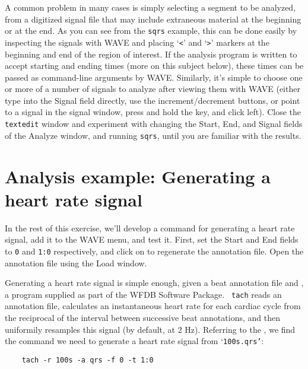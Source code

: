 \documentclass[twoside]{book}
\newcommand{\keycap}[1]{\cornersize{.5}\Ovalbox{\small\sf #1}}
\newcommand{\button}[1]{\cornersize{2}\ovalbox{\rule[-.3mm]{0cm}{2.5mm}\small\sf ~#1~}}
\newcommand{\WAVE}{{\sf WAVE}\xspace}
\begin{document}
A common problem in many cases is simply selecting a segment to be analyzed,
from a digitized signal file that may include extraneous material at the
beginning or at the end.  As you can see from the {\tt sqrs} example, this can
be done easily by inspecting the signals with \WAVE{} and placing `{\tt <}'
and `{\tt >}' markers at the beginning and end of the region of interest.  If
the analysis program is written to accept starting and ending times (more on
this subject below), these times can be passed as command-line arguments by
\WAVE{}.  Similarly, it's simple to choose one or more of a number of
signals to analyze after viewing them with \WAVE{} (either type into the
{\sf Signal} field directly, use the increment/decrement buttons, or point to
a signal in the signal window, press and hold the \keycap{Shift} key, and click
left).  Close the {\tt textedit} window and experiment with changing the {\sf
Start}, {\sf End}, and {\sf Signal} fields of the {\sf Analyze} window, and
running {\tt sqrs}, until you are familiar with the results.

\label{sec:analysis-example}
\section{Analysis example: Generating a heart rate signal}
In the rest of this exercise, we'll develop a command for generating a heart
rate signal, add it to the \WAVE{} menu, and test it.  First, set the {\sf
Start} and {\sf End} fields to {\tt 0} and {\tt 1:0} respectively, and click on
\button{Mark QRS complexes} to regenerate the annotation file.  Open
the annotation file using the {\sf Load} window.

Generating a heart rate signal is simple enough, given a beat annotation file
and 
,
a program supplied as part of the WFDB Software Package.  {\tt
tach} reads an annotation file, calculates an instantaneous heart rate for each
cardiac cycle from the reciprocal of the interval between successive beat
annotations, and then uniformily resamples this signal (by default, at 2 Hz).
Referring to the 
,
we find the command we need to generate a heart rate signal from
`{\tt 100s.qrs'}:
\begin{verbatim}
    tach -r 100s -a qrs -f 0 -t 1:0
\end{verbatim}
\end{document}

